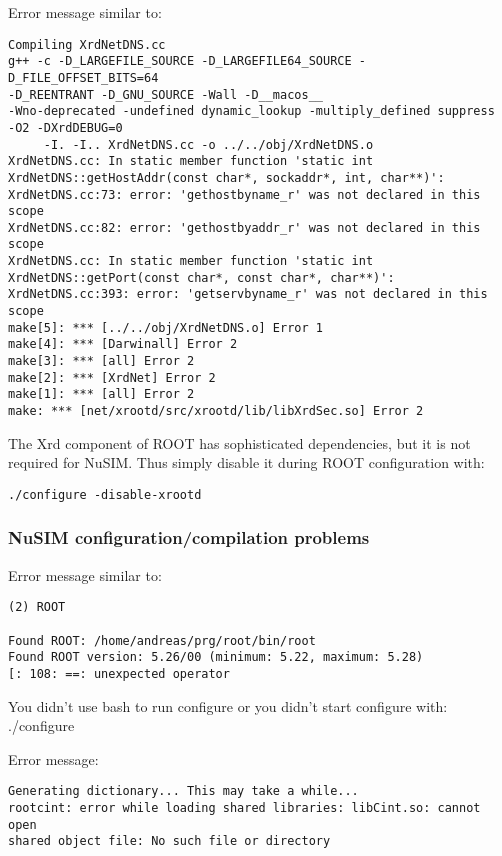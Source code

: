 Error message similar to:
{\scriptsize \begin{verbatim}
Compiling XrdNetDNS.cc
g++ -c -D_LARGEFILE_SOURCE -D_LARGEFILE64_SOURCE -D_FILE_OFFSET_BITS=64 
-D_REENTRANT -D_GNU_SOURCE -Wall -D__macos__  
-Wno-deprecated -undefined dynamic_lookup -multiply_defined suppress  -O2 -DXrdDEBUG=0 
     -I. -I.. XrdNetDNS.cc -o ../../obj/XrdNetDNS.o
XrdNetDNS.cc: In static member function 'static int XrdNetDNS::getHostAddr(const char*, sockaddr*, int, char**)':
XrdNetDNS.cc:73: error: 'gethostbyname_r' was not declared in this scope
XrdNetDNS.cc:82: error: 'gethostbyaddr_r' was not declared in this scope
XrdNetDNS.cc: In static member function 'static int XrdNetDNS::getPort(const char*, const char*, char**)':
XrdNetDNS.cc:393: error: 'getservbyname_r' was not declared in this scope
make[5]: *** [../../obj/XrdNetDNS.o] Error 1
make[4]: *** [Darwinall] Error 2
make[3]: *** [all] Error 2
make[2]: *** [XrdNet] Error 2
make[1]: *** [all] Error 2
make: *** [net/xrootd/src/xrootd/lib/libXrdSec.so] Error 2
\end{verbatim}
}
The Xrd component of ROOT has sophisticated dependencies, but it is not required for NuSIM. Thus simply disable it during ROOT configuration with:
\begin{verbatim}
./configure -disable-xrootd
\end{verbatim}


\subsubsection{NuSIM configuration/compilation problems}

Error message similar to:
\begin{verbatim}
(2) ROOT

Found ROOT: /home/andreas/prg/root/bin/root
Found ROOT version: 5.26/00 (minimum: 5.22, maximum: 5.28)
[: 108: ==: unexpected operator
\end{verbatim}
You didn't use bash to run configure or you didn't start configure with: ./configure


Error message:
\begin{verbatim}
Generating dictionary... This may take a while...
rootcint: error while loading shared libraries: libCint.so: cannot open
shared object file: No such file or directory
\end{verbatim}


